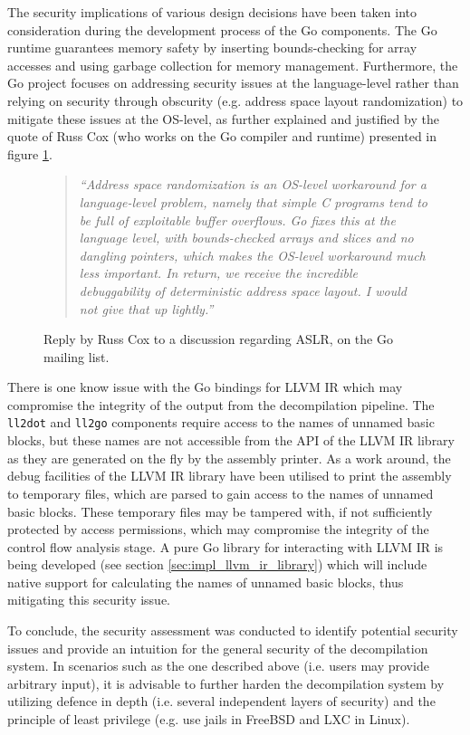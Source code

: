 The security implications of various design decisions have been taken into consideration during the development process of the Go components. The Go runtime guarantees memory safety by inserting bounds-checking for array accesses and using garbage collection for memory management. Furthermore, the Go project focuses on addressing security issues at the language-level rather than relying on security through obscurity (e.g. address space layout randomization) to mitigate these issues at the OS-level, as further explained and justified by the quote of Russ Cox (who works on the Go compiler and runtime) presented in figure \ref{fig:no_aslr}.

\begin{figure}[htbp]
	\begin{quote}
		\textit{``Address space randomization is an OS-level workaround for a language-level problem, namely that simple C programs tend to be full of exploitable buffer overflows. Go fixes this at the language level, with bounds-checked arrays and slices and no dangling pointers, which makes the OS-level workaround much less important. In return, we receive the incredible debuggability of deterministic address space layout. I would not give that up lightly.''}
	\end{quote}
	\caption{Reply by Russ Cox to a discussion regarding ASLR, on the Go mailing list\protect\footnotemark.}
	\label{fig:no_aslr}
\end{figure}

There is one know issue with the Go bindings for LLVM IR which may compromise the integrity of the output from the decompilation pipeline. The \texttt{ll2dot} and \texttt{ll2go} components require access to the names of unnamed basic blocks, but these names are not accessible from the API of the LLVM IR library as they are generated on the fly by the assembly printer. As a work around, the debug facilities of the LLVM IR library have been utilised to print the assembly to temporary files, which are parsed to gain access to the names of unnamed basic blocks. These temporary files may be tampered with, if not sufficiently protected by access permissions, which may compromise the integrity of the control flow analysis stage. A pure Go library for interacting with LLVM IR is being developed (see section \ref{sec:impl_llvm_ir_library}) which will include native support for calculating the names of unnamed basic blocks, thus mitigating this security issue.

To conclude, the security assessment was conducted to identify potential security issues and provide an intuition for the general security of the decompilation system. In scenarios such as the one described above (i.e. users may provide arbitrary input), it is advisable to further harden the decompilation system by utilizing defence in depth (i.e. several independent layers of security) and the principle of least privilege (e.g. use jails in FreeBSD and LXC in Linux).
